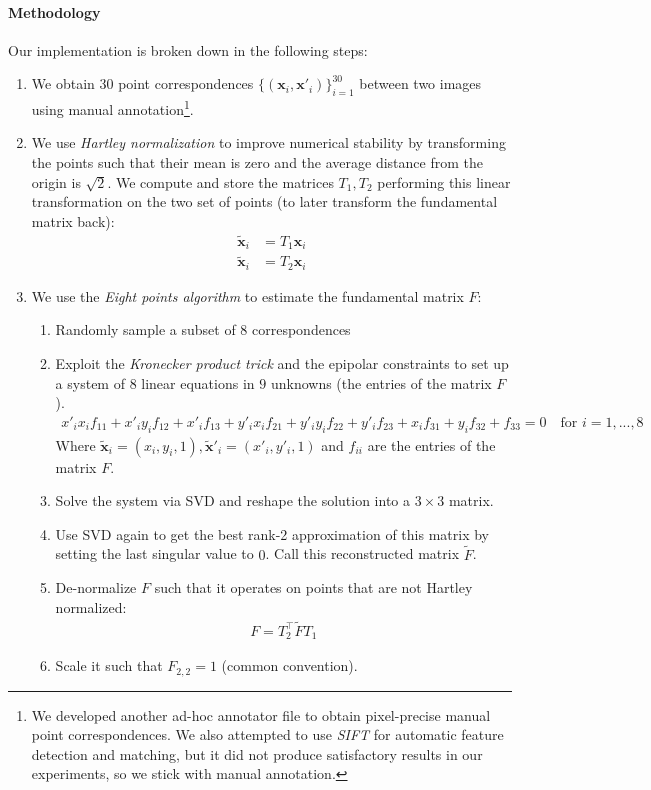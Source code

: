 \paragraph{Methodology} Our implementation is broken down in the following steps:

\begin{enumerate}
    \item We obtain $30$ point correspondences $\{(\mathbf{x}_i, \mathbf{x}'_i)\}_{i=1}^{30}$ between two images using manual annotation\footnote{We developed another ad-hoc annotator file to obtain pixel-precise manual point correspondences. We also attempted to use \textit{SIFT} for automatic feature detection and matching, but it did not produce satisfactory results in our experiments, so we stick with manual annotation.}.
    
    \item We use \textit{Hartley normalization} to improve numerical stability by transforming the points such that their mean is zero and the average distance from the origin is $\sqrt{2}$. We compute and store the matrices $T_1, T_2$ performing this linear transformation on the two set of points (to later transform the fundamental matrix back):
    \begin{align*}
        \tilde{\mathbf{x}}_i &= T_1\mathbf{x}_i \\
        \tilde{\mathbf{x}}_i &= T_2\mathbf{x}_i
    \end{align*}

\item We use the \textit{Eight points algorithm} to estimate the fundamental matrix $F$:
\begin{enumerate}
    \item Randomly sample a subset of $8$ correspondences
    \item Exploit the \textit{Kronecker product trick} and the epipolar constraints to set up a system of $8$ linear equations in $9$ unknowns (the entries of the matrix $F$).
    \begin{align*}
        x'_i x_i f_{11} + x'_i y_i f_{12} + x'_i f_{13} + y'_i x_i f_{21} + y'_i y_i f_{22} + y'_i f_{23} + x_i f_{31} + y_i f_{32} + f_{33} = 0 \quad \text{for } i=1,...,8
    \end{align*}
    Where $\tilde{\mathbf{x}}_i = (x_i, y_i, 1), \tilde{\mathbf{x}}'_i = (x'_i,y'_i, 1)$ and $f_{ii}$ are the entries of the matrix $F$.
    \item Solve the system via SVD and reshape the solution into a $3 \times 3$ matrix.
    \item Use SVD again to get the best rank-2 approximation of this matrix by setting the last singular value to $0$. Call this reconstructed matrix $\tilde{F}$.
    \item De-normalize $F$ such that it operates on points that are not Hartley normalized:
    \begin{align*}
        F = T_2^\top \tilde{F} T_1
    \end{align*}
    \item Scale it such that $F_{2,2} = 1$ (common convention).
\end{enumerate}


\end{enumerate}
